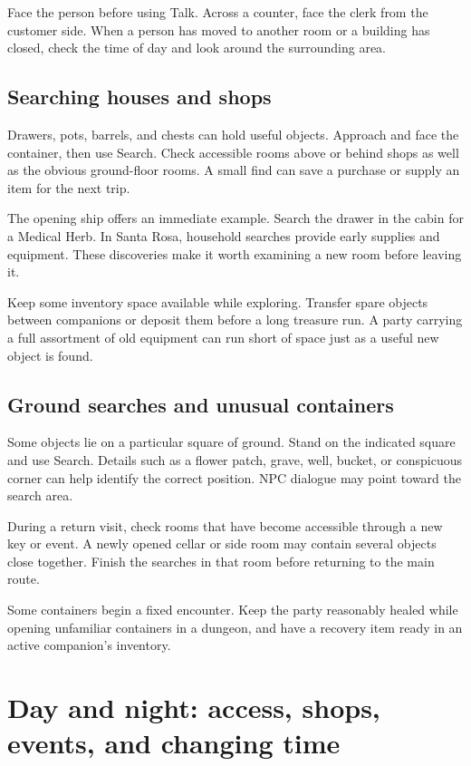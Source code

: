 Face the person before using Talk. Across a counter, face the clerk from
the customer side. When a person has moved to another room or a building
has closed, check the time of day and look around the surrounding area.

\subsection*{Searching houses and shops}

Drawers, pots, barrels, and chests can hold useful objects. Approach and
face the container, then use Search. Check accessible rooms above or
behind shops as well as the obvious ground-floor rooms. A small find can
save a purchase or supply an item for the next trip.

The opening ship offers an immediate example. Search the drawer in the
cabin for a Medical Herb. In Santa Rosa, household searches provide early
supplies and equipment. These discoveries make it worth examining a new
room before leaving it.

Keep some inventory space available while exploring. Transfer spare
objects between companions or deposit them before a long treasure run.
A party carrying a full assortment of old equipment can run short of
space just as a useful new object is found.

\subsection*{Ground searches and unusual containers}

Some objects lie on a particular square of ground. Stand on the indicated
square and use Search. Details such as a flower patch, grave, well,
bucket, or conspicuous corner can help identify the correct position.
NPC dialogue may point toward the search area.

During a return visit, check rooms that have become accessible through
a new key or event. A newly opened cellar or side room may contain several
objects close together. Finish the searches in that room before returning
to the main route.

Some containers begin a fixed encounter. Keep the party reasonably healed
while opening unfamiliar containers in a dungeon, and have a recovery
item ready in an active companion's inventory.

\section{Day and night: access, shops, events, and changing time}


